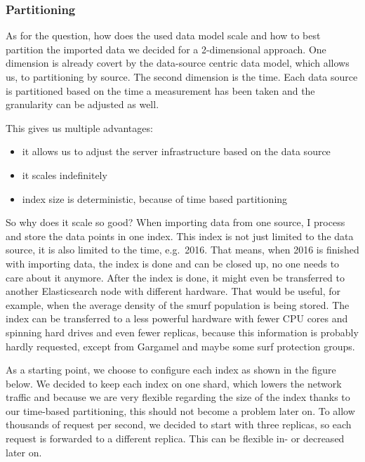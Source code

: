 \subsubsection{Partitioning}\label{partitioning}

As for the question, how does the used data model scale and how to best
partition the imported data we decided for a 2-dimensional approach. One
dimension is already covert by the data-source centric data model, which
allows us, to partitioning by source. The second dimension is the time.
Each data source is partitioned based on the time a measurement has been
taken and the granularity can be adjusted as well.

This gives us multiple advantages:

\begin{itemize}
\tightlist
\item
  it allows us to adjust the server infrastructure based on the data
  source
\item
  it scales indefinitely
\item
  index size is deterministic, because of time based partitioning
\end{itemize}

So why does it scale so good? When importing data from one source, I
process and store the data points in one index. This index is not just
limited to the data source, it is also limited to the time, e.g.~2016.
That means, when 2016 is finished with importing data, the index is done
and can be closed up, no one needs to care about it anymore. After the
index is done, it might even be transferred to another Elasticsearch
node with different hardware. That would be useful, for example, when
the average density of the smurf population is being stored. The index
can be transferred to a less powerful hardware with fewer CPU cores and
spinning hard drives and even fewer replicas, because this information
is probably hardly requested, except from Gargamel and maybe some surf
protection groups.

As a starting point, we choose to configure each index as shown in the
figure below. We decided to keep each index on one shard, which lowers
the network traffic and because we are very flexible regarding the size
of the index thanks to our time-based partitioning, this should not
become a problem later on. To allow thousands of request per second, we
decided to start with three replicas, so each request is forwarded to a
different replica. This can be flexible in- or decreased later on.

